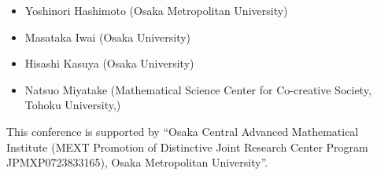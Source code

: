\documentclass[dvipdfmx,a4paper,12pt]{article}
\theoremstyle{plain} %
\theoremstyle{definition} %
\begin{document}

\newpage 

\begin{itemize}
  \setlength{\parskip}{0cm} 
  \setlength{\itemsep}{0cm}
\item Yoshinori Hashimoto (Osaka Metropolitan University)
\item Masataka Iwai (Osaka University)
\item Hisashi Kasuya (Osaka University)
\item Natsuo Miyatake (Mathematical Science Center for Co-creative Society, Tohoku University,)
  \end{itemize}


This conference is supported by “Osaka Central Advanced Mathematical Institute (MEXT Promotion of Distinctive Joint Research Center Program JPMXP0723833165), Osaka Metropolitan University”.
\end{document}
